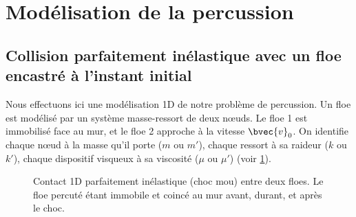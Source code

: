 


\section{Modélisation de la percussion}









\subsection{Collision parfaitement inélastique avec un floe encastré à l'instant initial}



Nous effectuons ici une modélisation 1D de notre problème de percussion. Un floe est modélisé par un système masse-ressort de deux n\oe{}uds. Le floe 1 est immobilisé face au mur, et le floe 2 approche à la vitesse $\bvec{v}_0$. On identifie chaque n\oe{}ud à la masse qu'il porte ($m$ ou $m'$), chaque ressort à sa raideur ($k$ ou $k'$), chaque dispositif visqueux à sa viscosité ($\mu$ ou $\mu'$) (voir \cref{fig:contact1d}).
\begin{figure}[!h]
    \centering
    \caption{Contact 1D parfaitement inélastique (choc mou) entre deux floes. Le floe percuté étant immobile et coincé au mur avant, durant, et après le choc.}
    \label{fig:contact1d}
\end{figure}

